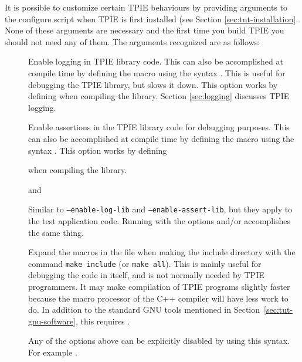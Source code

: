 It is possible to customize certain TPIE behaviours by
providing arguments to the {configure} script when TPIE is
first installed (see Section
\ref{sec:tut-installation}. None of
these arguments are necessary and the first time you build
TPIE you should not need any of them. The arguments
recognized are as follows:
\begin{description}

    \item[]
     Enable
    logging in TPIE library code.  This can also be
    accomplished at compile time by defining the macro
     using the syntax .  This is useful for debugging the
    TPIE library, but slows it down.  This option works by
    defining   when compiling the library.
    Section \ref{sec:logging} discusses TPIE logging.

    \item[]
    Enable assertions in the TPIE library code for debugging
    purposes.  This can also be accomplished at compile time
    by defining the macro  using the
    syntax .  This option
    works by defining 

     when
    compiling the library.
    \item[] and
    
    \item[]
     Similar
    to {\tt --enable-log-lib} and {\tt --enable-assert-lib},
    but they apply to the test application code.  Running
     with the options
     and/or
     accomplishes the same thing.
    
    \item[] Expand the
    macros in the file  when making the
    include directory with the command {\tt make include}
    (or {\tt make all}).  This is mainly useful for
    debugging the code in  itself, and
    is not normally needed by TPIE programmers.  It may make
    compilation of TPIE programs slightly faster because the
    macro processor of the C++ compiler will have less work
    to do.  In addition to the standard GNU tools mentioned
    in Section~\ref{sec:tut-gnu-software}, this requires
    .
    
    \item[] Any of the options above can
    be explicitly disabled by using this syntax.  For
    example .
\end{description}

